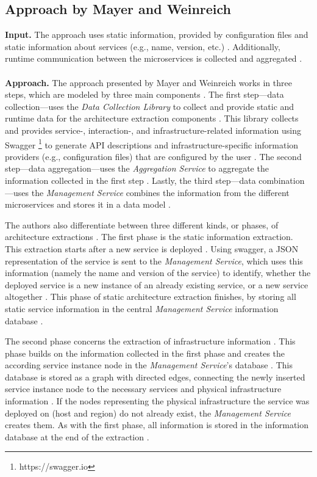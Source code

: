\subsection{Approach by Mayer and Weinreich}
\label{sec:Results:Mayer}
\textbf{Input.}
The approach uses static information, provided by configuration files and static information about services (e.g., name, version, etc.) \cite{Mayer2018}.
Additionally, runtime communication between the microservices is collected and aggregated \cite{Mayer2018}.
\\ \\
\textbf{Approach.}
The approach presented by Mayer and Weinreich works in three steps, which are modeled by three main components \cite{Mayer2018}.
The first step---data collection---uses the \textit{Data Collection Library} to collect and provide static and runtime data for the architecture extraction components \cite{Mayer2018}.
This library collects and provides service-, interaction-, and infrastructure-related information using Swagger \footnote{https://swagger.io} to generate API descriptions and infrastructure-specific information providers (e.g., configuration files) that are configured by the user \cite{Mayer2018}.
The second step---data aggregation---uses the \textit{Aggregation Service} to aggregate the information collected in the first step \cite{Mayer2018}.
Lastly, the third step---data combination---uses the \textit{Management Service} combines the information from the different microservices and stores it in a data model \cite{Mayer2018}.

The authors also differentiate between three different kinds, or phases, of architecture extractions \cite{Mayer2018}.
The first phase is the static information extraction.
This extraction starts after a new service is deployed \cite{Mayer2018}.
Using swagger, a JSON representation of the service is sent to the \textit{Management Service}, which uses this information (namely the name and version of the service) to identify, whether the deployed service is a new instance of an already existing service, or a new service altogether \cite{Mayer2018}.
This phase of static architecture extraction finishes, by storing all static service information in the central \textit{Management Service} information database \cite{Mayer2018}.

The second phase concerns the extraction of infrastructure information \cite{Mayer2018}.
This phase builds on the information collected in the first phase and creates the according service instance node in the \textit{Management Service}'s database \cite{Mayer2018}.
This database is stored as a graph with directed edges, connecting the newly inserted service instance node to the necessary services and physical infrastructure information \cite{Mayer2018}.
If the nodes representing the physical infrastructure the service was deployed on (host and region) do not already exist, the \textit{Management Service} creates them.
As with the first phase, all information is stored in the information database at the end of the extraction \cite{Mayer2018}.

